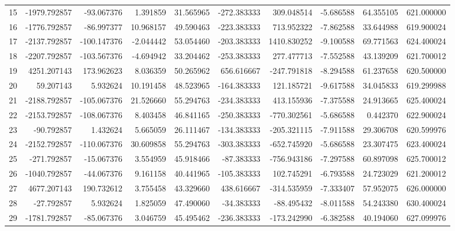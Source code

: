 \begin{tabular}{lrrrrrrrrr}
15  &  -1979.792857 &   -93.067376 &   1.391859 &  31.565965 &  -272.383333 &   309.048514 &  -5.686588 &  64.355105 &  621.000000 \\
16  &  -1776.792857 &   -86.997377 &  10.968157 &  49.590463 &  -223.383333 &   713.952322 &  -7.862588 &  33.644988 &  619.900024 \\
17  &  -2137.792857 &  -100.147376 &  -2.044442 &  53.054460 &  -203.383333 &  1410.830252 &  -9.100588 &  69.771563 &  624.400024 \\
18  &  -2207.792857 &  -103.567376 &  -4.694942 &  33.204462 &  -253.383333 &   277.477713 &  -7.552588 &  43.139209 &  621.700012 \\
19  &   4251.207143 &   173.962623 &   8.036359 &  50.265962 &   656.616667 &  -247.791818 &  -8.294588 &  61.237658 &  620.500000 \\
20  &     59.207143 &     5.932624 &  10.191458 &  48.523965 &  -164.383333 &   121.185721 &  -9.617588 &  34.045833 &  619.299988 \\
21  &  -2188.792857 &  -105.067376 &  21.526660 &  55.294763 &  -234.383333 &   413.155936 &  -7.375588 &  24.913665 &  625.400024 \\
22  &  -2153.792857 &  -108.067376 &   8.403458 &  46.841165 &  -250.383333 &  -770.302561 &  -5.686588 &   0.442370 &  622.900024 \\
23  &    -90.792857 &     1.432624 &   5.665059 &  26.111467 &  -134.383333 &  -205.321115 &  -7.911588 &  29.306708 &  620.599976 \\
24  &  -2152.792857 &  -110.067376 &  30.609858 &  55.294763 &  -303.383333 &  -652.745920 &  -5.686588 &  23.307475 &  623.400024 \\
25  &   -271.792857 &   -15.067376 &   3.554959 &  45.918466 &   -87.383333 &  -756.943186 &  -7.297588 &  60.897098 &  625.700012 \\
26  &  -1040.792857 &   -44.067376 &   9.161158 &  40.441965 &  -105.383333 &   102.745291 &  -6.793588 &  24.723029 &  621.200012 \\
27  &   4677.207143 &   190.732612 &   3.755458 &  43.329660 &   438.616667 &  -314.535959 &  -7.333407 &  57.952075 &  626.000000 \\
28  &    -27.792857 &     5.932624 &   1.825059 &  47.490060 &   -34.383333 &   -88.495432 &  -8.011588 &  54.243380 &  630.400024 \\
29  &  -1781.792857 &   -85.067376 &   3.046759 &  45.495462 &  -236.383333 &  -173.242990 &  -6.382588 &  40.194060 &  627.099976 \\

\end{tabular}
